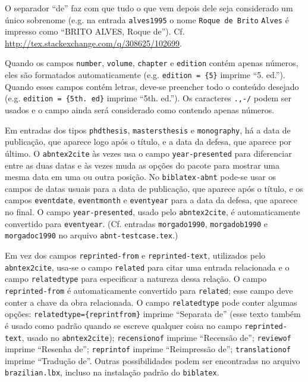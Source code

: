 \documentclass[a4paper]{article}
\begin{document}
\begin{itemize}
\begin{sloppypar}
    \item O separador ``de'' faz com que tudo o que vem depois dele seja considerado um único sobrenome (e.g. na entrada \texttt{alves1995} o nome \texttt{Roque de Brito} \texttt{Alves} é impresso como ``BRITO ALVES, Roque de''). Cf. \url{http://tex.stackexchange.com/q/308625/102699}.
    \item Quando os campos \texttt{number}, \texttt{volume}, \texttt{chapter} e \texttt{edition} contém apenas números, eles são formatados automaticamente (e.g. \texttt{edition = \{5\}} imprime ``5. ed.''). Quando esses campos contém letras, deve-se preencher todo o conteúdo desejado (e.g. \verb"edition = {5th. ed}" imprime ``5th. ed.''). Os caracteres \texttt{.,-/} podem ser usados e o campo ainda será considerado como contendo apenas números.
    \item Em entradas dos tipos \texttt{phdthesis}, \texttt{mastersthesis} e \texttt{monography}, há a data de publicação, que aparece logo após o título, e a data da defesa, que aparece por último. O \texttt{abntex2cite} às vezes usa o campo \texttt{year-presented} para diferenciar entre as duas datas e às vezes muda as opções do pacote para mostrar uma mesma data em uma ou outra posição. No \texttt{biblatex-abnt} pode-se usar os campos de datas usuais para a data de publicação, que aparece após o título, e os campos \texttt{eventdate}, \texttt{eventmonth} e \texttt{eventyear} para a data da defesa, que aparece no final. O campo \texttt{year-presented}, usado pelo \texttt{abntex2cite}, é automaticamente convertido para \texttt{eventyear}. (Cf. entradas \texttt{morgado1990}, \texttt{morgadob1990} e \texttt{morgadoc1990} no arquivo \texttt{abnt-testcase.tex}.)
    \item Em vez dos campos \texttt{reprinted-from} e \texttt{reprinted-text}, utilizados pelo \texttt{abntex2cite}, usa-se o campo \texttt{related} para citar uma entrada relacionada e o campo \texttt{relatedtype} para especificar a natureza dessa relação. O campo \texttt{reprinted-from} é automaticamente convertido para \texttt{related}; esse campo deve conter a chave da obra relacionada. O campo \texttt{relatedtype} pode conter algumas opções: \texttt{relatedtype=\{reprintfrom\}} imprime ``Separata de'' (esse texto também é usado como padrão quando se escreve qualquer coisa no campo \texttt{reprinted-text}, usado no \texttt{abntex2cite}); \texttt{recensionof} imprime ``Recensão de''; \texttt{reviewof} imprime ``Resenha de''; \texttt{reprintof} imprime ``Reimpressão de''; \texttt{translationof} imprime ``Tradução de''. Outras possibilidades podem ser encontradas no arquivo \texttt{brazilian.lbx}, incluso na instalação padrão do \texttt{biblatex}.

\end{sloppypar}
\end{itemize}
\end{document}
